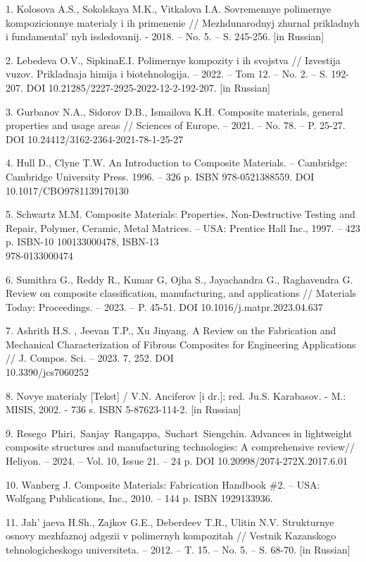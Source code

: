 \begin{references}
1. Kolosova A.S., Sokolskaya M.K., Vitkalova I.A. Sovremennye polimernye
kompozicionnye materialy i ih primenenie // Mezhdunarodnyj zhurnal
prikladnyh i fundamental' nyh issledovanij. - 2018. --
No. 5. -- S. 245-256. {[}in Russian{]}

2. Lebedeva O.V., SipkinaE.I. Polimernye kompozity i ih svojstva //
Izvestija vuzov. Prikladnaja himija i biotehnologija. -- 2022. -- Tom
12. -- No. 2. -- S. 192-207. DOI 10.21285/2227-2925-2022-12-2-192-207.
{[}in Russian{]}

3. Gurbanov N.A., Sidorov D.B., Ismailova K.H. Composite materials,
general properties and usage areas // Sciences of Europe. -- 2021. --
No. 78. -- P. 25-27. DOI 10.24412/3162-2364-2021-78-1-25-27

4. Hull D., Clyne T.W. An Introduction to Composite Materials. --
Cambridge: Cambridge University Press. 1996. -- 326 p. ISBN
978-0521388559. DOI 10.1017/CBO9781139170130

5. Schwartz M.M. Composite Materials: Properties, Non-Destructive
Testing and Repair, Polymer, Cera\-mic, Metal Matrices. -- USA: Prentice
Hall Inc., 1997. -- 423 p. ISBN-10 100133000478, ISBN-13 \\978-0133000474

6. Sumithra G., Reddy R., Kumar G, Ojha S., Jayachandra G., Raghavendra
G. Review on composite classification, manufacturing, and applications
// Materials Today: Proceedings. -- 2023. -- P. 45-51. DOI
10.1016/j.matpr.2023.04.637

7. Ashrith H.S. , Jeevan T.P., Xu Jinyang. A Review on the Fabrication
and Mechanical Characterization of Fibrous Composites for Engineering
Applications // J. Compos. Sci. -- 2023. 7, 252. DOI \\10.3390/jcs7060252

8. Novye materialy {[}Tekst{]} / V.N. Anciferov {[}i dr.{]}; red. Ju.S.
Karabasov. - M.: MISIS, 2002. - 736 s. ISBN 5-87623-114-2. {[}in
Russian{]}

9. Resego~Phiri,~Sanjay~Rangappa,~Suchart~Siengchin. Advances in
lightweight composite structures and manufacturing technologies: A
comprehensive review// Heliyon. -- 2024. -- Vol. 10, Issue 21. -- 24 p.
DOI 10.20998/2074-272X.2017.6.01

10. Wanberg J. Composite Materials: Fabrication Handbook \#2. -- USA:
Wolfgang Publications, Inc., 2010. -- 144 p. ISBN 1929133936.

11. Jah' jaeva H.Sh., Zajkov G.E., Deberdeev T.R., Ulitin
N.V. Strukturnye osnovy mezhfaznoj adgezii v polimernyh kompozitah //
Vestnik Kazanskogo tehnologicheskogo universiteta. -- 2012. -- T. 15. --
No. 5. -- S. 68-70. {[}in Russian{]}


\end{references}
